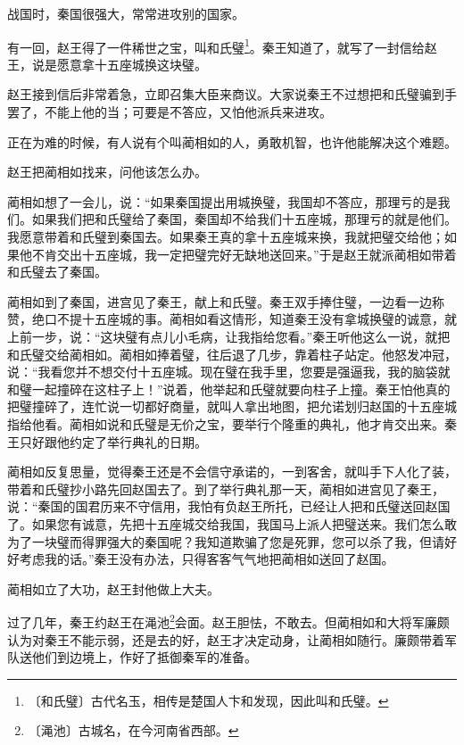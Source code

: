 \documentclass[12pt,UTF-8,openany]{ctexbook}
\begin{document}
\begin{Large}
    
    战国时，秦国很强大，常常进攻别的国家。
    
    有一回，赵王得了一件稀世之宝，叫和氏璧\footnote{〔和氏璧〕古代名玉，相传是楚国人卞和发现，因此叫和氏璧。}。秦王知道了，就写了一封信给赵王，说是愿意拿十五座城换这块璧。
    
    赵王接到信后非常着急，立即召集大臣来商议。大家说秦王不过想把和氏璧骗到手罢了，不能上他的当；可要是不答应，又怕他派兵来进攻。
    
    正在为难的时候，有人说有个叫蔺相如的人，勇敢机智，也许他能解决这个难题。
    
    赵王把蔺相如找来，问他该怎么办。
    
    蔺相如想了一会儿，说：“如果秦国提出用城换璧，我国却不答应，那理亏的是我们。如果我们把和氏璧给了秦国，秦国却不给我们十五座城，那理亏的就是他们。我愿意带着和氏璧到秦国去。如果秦王真的拿十五座城来换，我就把璧交给他；如果他不肯交出十五座城，我一定把璧完好无缺地送回来。”于是赵王就派蔺相如带着和氏璧去了秦国。
    
    蔺相如到了秦国，进宫见了秦王，献上和氏璧。秦王双手捧住璧，一边看一边称赞，绝口不提十五座城的事。蔺相如看这情形，知道秦王没有拿城换璧的诚意，就上前一步，说：“这块璧有点儿小毛病，让我指给您看。”秦王听他这么一说，就把和氏璧交给蔺相如。蔺相如捧着璧，往后退了几步，靠着柱子站定。他怒发冲冠，说：“我看您并不想交付十五座城。现在璧在我手里，您要是强逼我，我的脑袋就和璧一起撞碎在这柱子上！”说着，他举起和氏璧就要向柱子上撞。秦王怕他真的把璧撞碎了，连忙说一切都好商量，就叫人拿出地图，把允诺划归赵国的十五座城指给他看。蔺相如说和氏璧是无价之宝，要举行个隆重的典礼，他才肯交出来。秦王只好跟他约定了举行典礼的日期。
    
    蔺相如反复思量，觉得秦王还是不会信守承诺的，一到客舍，就叫手下人化了装，带着和氏璧抄小路先回赵国去了。到了举行典礼那一天，蔺相如进宫见了秦王，说：“秦国的国君历来不守信用，我怕有负赵王所托，已经让人把和氏璧送回赵国了。如果您有诚意，先把十五座城交给我国，我国马上派人把璧送来。我们怎么敢为了一块璧而得罪强大的秦国呢？我知道欺骗了您是死罪，您可以杀了我，但请好好考虑我的话。”秦王没有办法，只得客客气气地把蔺相如送回了赵国。
    
    蔺相如立了大功，赵王封他做上大夫。
    
    过了几年，秦王约赵王在渑池\footnote{〔渑池〕古城名，在今河南省西部。}会面。赵王胆怯，不敢去。但蔺相如和大将军廉颇认为对秦王不能示弱，还是去的好，赵王才决定动身，让蔺相如随行。廉颇带着军队送他们到边境上，作好了抵御秦军的准备。
    

\end{Large}
\end{document}
